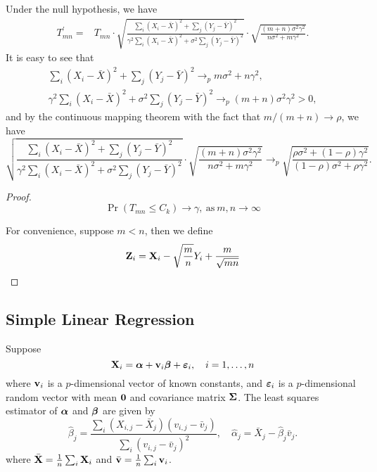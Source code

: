 Under the null hypothesis, we have
\begin{equation*}
	\begin{aligned}
		T_{mn}^{\prime}= & T_{mn}\cdot\sqrt{\frac{\sum_{i}\left(X_i-\bar{X}\right)^2+\sum_{j}\left(Y_j-\bar{Y}\right)^2}{\gamma^{2}\sum_{i}\left(X_i-\bar{X}\right)^2+\sigma^{2}\sum_{j}\left(Y_j-\bar{Y}\right)^2}}\cdot\sqrt{\frac{(m+n)\sigma^{2}\gamma^{2}}{n\sigma^{2}+m\gamma^{2}}}.
	\end{aligned}
\end{equation*}
It is easy to see that
\begin{gather*}
	\sum_{i}\left(X_i-\bar{X}\right)^2+\sum_{j}\left(Y_j-\bar{Y}\right)^2\rightarrow_{p} m\sigma^{2}+n\gamma^{2},\\
	\gamma^{2}\sum_{i}\left(X_i-\bar{X}\right)^2+\sigma^{2}\sum_{j}\left(Y_j-\bar{Y}\right)^2\rightarrow_{p} (m+n)\sigma^{2}\gamma^{2}>0,
\end{gather*}
and by the continuous mapping theorem with the fact that \(m/(m+n)\rightarrow\rho\), we have
\begin{equation*}
	\sqrt{\frac{\sum_{i}\left(X_i-\bar{X}\right)^2+\sum_{j}\left(Y_j-\bar{Y}\right)^2}{\gamma^{2}\sum_{i}\left(X_i-\bar{X}\right)^2+\sigma^{2}\sum_{j}\left(Y_j-\bar{Y}\right)^2}}\cdot\sqrt{\frac{(m+n)\sigma^{2}\gamma^{2}}{n\sigma^{2}+m\gamma^{2}}}\rightarrow_{p}\sqrt{\frac{\rho\sigma^{2}+(1-\rho)\gamma^{2}}{(1-\rho)\sigma^{2}+\rho\gamma^{2}}}.
\end{equation*}

\begin{proof}
	\begin{equation*}
		\Pr\left(T_{mn}\leq C_{k}\right)\rightarrow\gamma,\ \text{as}\ m,n\rightarrow\infty
	\end{equation*}

	For convenience, suppose \(m<n\), then we define
	\begin{equation*}
		\mathbf{Z}_{i}=\mathbf{X}_{i}-\sqrt{\frac{m}{n}}Y_{i}+\frac{m}{\sqrt{mn}}
	\end{equation*}
\end{proof}

\subsection{Simple Linear Regression}

Suppose
\begin{equation*}
	\mathbf{X}_{i}=\boldsymbol{\alpha}+\mathbf{v}_{i}\boldsymbol{\beta}+\boldsymbol{\varepsilon}_{i},\quad i=1,\ldots,n
\end{equation*}
where \(\mathbf{v}_{i}\) is a \(p\)-dimensional vector of known constants, and \(\boldsymbol{\varepsilon}_{i}\) is a \(p\)-dimensional random vector with mean \(\mathbf{0}\) and covariance matrix \(\boldsymbol{\Sigma}\). The least squares estimator of \(\boldsymbol{\alpha}\) and \(\boldsymbol{\beta}\) are given by
\begin{equation*}
	\hat{\beta}_{j}=\frac{\sum_{i}(X_{i,j}-\bar{X}_{j})(v_{i,j}-\bar{v}_{j})}{\sum_{i}(v_{i,j}-\bar{v}_{j})^{2}},\quad\hat{\alpha}_{j}=\bar{X}_{j}-\hat{\beta}_{j}\bar{v}_{j}.
\end{equation*}
where \(\bar{\mathbf{X}}=\frac{1}{n}\sum_{i}\mathbf{X}_{i}\) and \(\bar{\mathbf{v}}=\frac{1}{n}\sum_{i}\mathbf{v}_{i}\).

